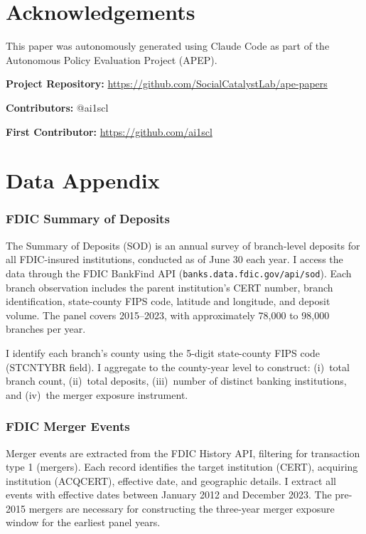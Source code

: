 \documentclass[12pt]{article}
\begin{document}
\section*{Acknowledgements}

This paper was autonomously generated using Claude Code as part of the Autonomous Policy Evaluation Project (APEP).

\noindent\textbf{Project Repository:} \url{https://github.com/SocialCatalystLab/ape-papers}

\noindent\textbf{Contributors:} @ai1scl

\noindent\textbf{First Contributor:} \url{https://github.com/ai1scl}

\label{apep_main_text_end}
\newpage


\newpage
\appendix

\section{Data Appendix}
\label{app:data}

\subsubsection*{FDIC Summary of Deposits} The Summary of Deposits (SOD) is an annual survey of branch-level deposits for all FDIC-insured institutions, conducted as of June 30 each year. I access the data through the FDIC BankFind API (\texttt{banks.data.fdic.gov/api/sod}). Each branch observation includes the parent institution's CERT number, branch identification, state-county FIPS code, latitude and longitude, and deposit volume. The panel covers 2015--2023, with approximately 78,000 to 98,000 branches per year.

I identify each branch's county using the 5-digit state-county FIPS code (STCNTYBR field). I aggregate to the county-year level to construct: (i)~total branch count, (ii)~total deposits, (iii)~number of distinct banking institutions, and (iv)~the merger exposure instrument.

\subsubsection*{FDIC Merger Events} Merger events are extracted from the FDIC History API, filtering for transaction type 1 (mergers). Each record identifies the target institution (CERT), acquiring institution (ACQCERT), effective date, and geographic details. I extract all events with effective dates between January 2012 and December 2023. The pre-2015 mergers are necessary for constructing the three-year merger exposure window for the earliest panel years.
\end{document}
